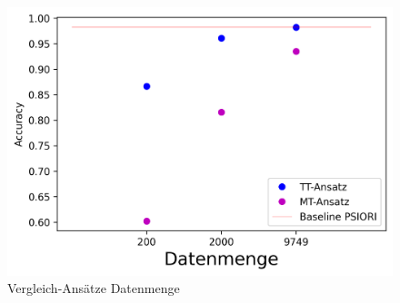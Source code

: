 	\begin{figure}[h]
		\centering
		\includegraphics[width=1\textwidth, center]{bilder/Hauptteil/Transfer_Logs_Datenmenge//Acc_compare_Logs_data.png}
		\caption{Vergleich-Ansätze Datenmenge}
		\label{img:VergleichDatenmenge}
	\end{figure}  
	
